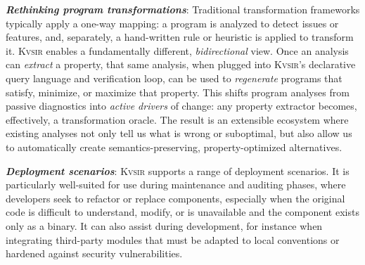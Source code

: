 \documentclass[sigplan,review,anonymous,10pt]{acmart}
\newcommand{\sys}{{\scshape Kv{\textalpha}sir}\xspace}
\newcommand{\heading}[1]{\vspace{2pt}\noindent\textbf{\emph{#1}}:\enspace}
\begin{document}
\heading{Rethinking program transformations}
Traditional transformation frameworks typically apply a one-way mapping: 
a program is analyzed to detect issues or features, and, separately, 
a hand-written rule or heuristic is applied to transform it. 
\sys enables a fundamentally different, \emph{bidirectional} view. 
Once an analysis can \emph{extract} a property,
that same analysis, when plugged into \sys's declarative query language and 
verification loop, can be used to \emph{regenerate} programs that 
satisfy, minimize, or maximize that property. 
This shifts program analyses from passive diagnostics into \emph{active drivers} 
of change: any property extractor becomes, effectively, a transformation oracle. 
The result is an extensible ecosystem where existing analyses not only tell us 
what is wrong or suboptimal, but also allow us to automatically create 
semantics-preserving, property-optimized alternatives.

\heading{Deployment scenarios}
\sys supports a range of deployment scenarios.
It is particularly well-suited for use during maintenance and auditing phases, where developers seek to refactor or replace components, especially when the original code is difficult to understand, modify, or is unavailable and the component exists only as a binary.
It can also assist during development, for instance when integrating
third-party modules that must be adapted to local conventions or hardened
against security vulnerabilities.

\end{document}
